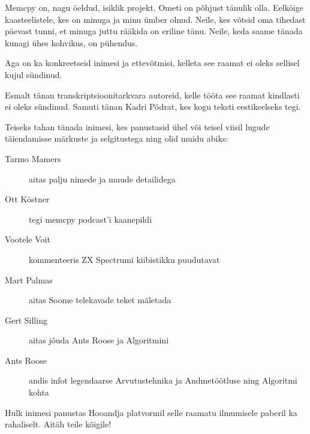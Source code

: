 Memcpy on, nagu öeldud, isiklik projekt. Ometi on põhjust tänulik olla. 
Eelkõige kaasteelistele, kes on minuga ja minu ümber olnud. Neile, kes võtsid 
oma tihedast päevast tunni, et minuga juttu rääkida on eriline tänu. Neile, keda saame tänada
kunagi ühes kohvikus, on pühendus.

Aga on ka konkreetseid inimesi ja ettevõtmisi, kelleta see raamat ei oleks sellisel kujul sündinud. 

Esmalt tänan transkriptsioonitarkvara autoreid, kelle tööta see raamat kindlasti ei oleks sündinud. Samuti tänan Kadri Põdrat, kes kogu teksti eestikeelseks tegi. 

Teiseks tahan tänada inimesi, kes panustasid ühel või teisel viisil lugude täiendamisse märkuste ja selgitustega ning olid muidu abiks:

\begin{description}
	\item[Tarmo Mamers] aitas palju nimede ja muude detailidega
	\item[Ott Köstner] tegi memcpy podcast'i kaanepildi
	\item[Vootele Voit] kommenteeris 
 ZX Spectrumi kiibistikku puudutavat
	\item[Mart Palmas] aitas Soome telekavade teket mäletada 
	\item[Gert Silling] aitas jõuda Ants Roose ja Algoritmini 
	\item[Ants Roose] andis infot legendaarse Arvutustehnika ja Andmetöötluse ning Algoritmi kohta 
\end{description}

Hulk inimesi panustas Hooandja platvormil selle raamatu ilmumisele paberil ka rahaliselt. Aitäh teile kõigile!

